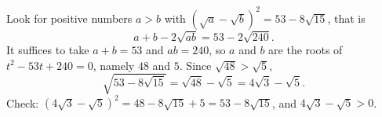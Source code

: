 Look for positive numbers $a>b$ with $\left(\sqrt a-\sqrt b\right)^2=53-8\sqrt{15}$, that is
\[a+b-2\sqrt{ab}=53-2\sqrt{240}.\]
It suffices to take $a+b=53$ and $ab=240$, so $a$ and $b$ are the roots of $t^2-53t+240=0$, namely $48$ and $5$. Since $\sqrt{48}>\sqrt5$,
\[\sqrt{53-8\sqrt{15}}=\sqrt{48}-\sqrt5=\boxed{4\sqrt3-\sqrt5}.\]
Check: $\left(4\sqrt3-\sqrt5\right)^2=48-8\sqrt{15}+5=53-8\sqrt{15}$, and $4\sqrt3-\sqrt5>0$.
